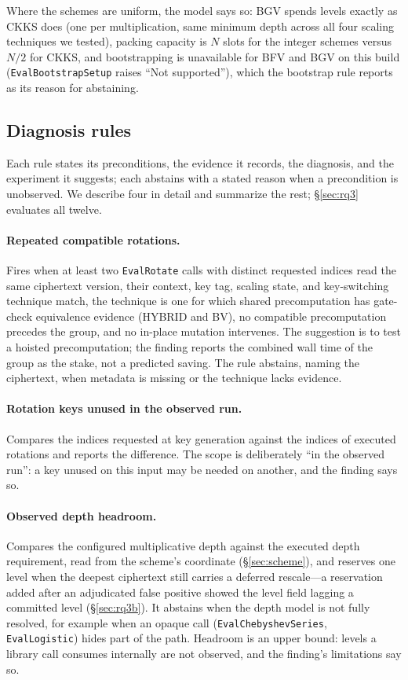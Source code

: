 \documentclass[sigconf,nonacm]{acmart}
\begin{document}
Where the schemes are uniform, the model says so: BGV spends levels exactly
as CKKS does (one per multiplication, same minimum depth across all four
scaling techniques we tested), packing capacity is $N$ slots for the integer
schemes versus $N/2$ for CKKS, and bootstrapping is unavailable for BFV and
BGV on this build (\texttt{EvalBootstrapSetup} raises ``Not supported''),
which the bootstrap rule reports as its reason for abstaining.

\subsection{Diagnosis rules}
\label{sec:rules}

Each rule states its preconditions, the evidence it records, the diagnosis,
and the experiment it suggests; each abstains with a stated reason when a
precondition is unobserved. We describe four in detail and summarize the
rest; \S\ref{sec:rq3} evaluates all twelve.

\paragraph{Repeated compatible rotations.} Fires when at least two
\texttt{EvalRotate} calls with distinct requested indices read the same
ciphertext version, their context, key tag, scaling state, and key-switching
technique match, the technique is one for which shared precomputation has
gate-check equivalence evidence (HYBRID and BV), no compatible
precomputation precedes the group, and no in-place mutation intervenes. The
suggestion is to test a hoisted precomputation; the finding reports the
combined wall time of the group as the stake, not a predicted saving. The
rule abstains, naming the ciphertext, when metadata is missing or the
technique lacks evidence.

\paragraph{Rotation keys unused in the observed run.} Compares the indices
requested at key generation against the indices of executed rotations and
reports the difference. The scope is deliberately ``in the observed run'': a
key unused on this input may be needed on another, and the finding says so.

\paragraph{Observed depth headroom.} Compares the configured multiplicative
depth against the executed depth requirement, read from the scheme's
coordinate (\S\ref{sec:scheme}), and reserves one level when the deepest
ciphertext still carries a deferred rescale---a reservation added after an
adjudicated false positive showed the level field lagging a committed level
(\S\ref{sec:rq3b}). It abstains when the depth model is not fully resolved,
for example when an opaque call (\texttt{EvalChebyshevSeries},
\texttt{EvalLogistic}) hides part of the path. Headroom is an upper bound:
levels a library call consumes internally are not observed, and the
finding's limitations say so.
\end{document}
